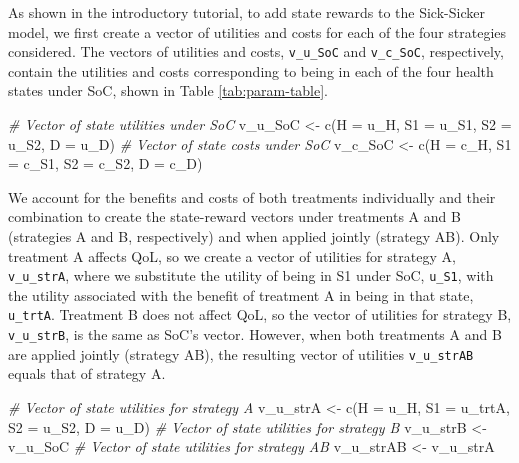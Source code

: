 \documentclass[
]{article}
\newenvironment{Shaded}{\begin{snugshade}}{\end{snugshade}}
\newcommand{\AttributeTok}[1]{\textcolor[rgb]{0.77,0.63,0.00}{#1}}
\newcommand{\CommentTok}[1]{\textcolor[rgb]{0.56,0.35,0.01}{\textit{#1}}}
\newcommand{\FunctionTok}[1]{\textcolor[rgb]{0.00,0.00,0.00}{#1}}
\newcommand{\NormalTok}[1]{#1}
\newcommand{\OtherTok}[1]{\textcolor[rgb]{0.56,0.35,0.01}{#1}}
\begin{document}
As shown in the introductory tutorial, to add state rewards to the Sick-Sicker model, we first create a vector of utilities and costs for each of the four strategies considered. The vectors of utilities and costs, \texttt{v\_u\_SoC} and \texttt{v\_c\_SoC}, respectively, contain the utilities and costs corresponding to being in each of the four health states under SoC, shown in Table \ref{tab:param-table}.

\begin{Shaded}
\begin{Highlighting}[]
\CommentTok{\# Vector of state utilities under SoC}
\NormalTok{v\_u\_SoC }\OtherTok{\textless{}{-}} \FunctionTok{c}\NormalTok{(}\AttributeTok{H =}\NormalTok{ u\_H, }\AttributeTok{S1 =}\NormalTok{ u\_S1, }\AttributeTok{S2 =}\NormalTok{ u\_S2, }\AttributeTok{D =}\NormalTok{ u\_D)}
\CommentTok{\# Vector of state costs under SoC}
\NormalTok{v\_c\_SoC }\OtherTok{\textless{}{-}} \FunctionTok{c}\NormalTok{(}\AttributeTok{H =}\NormalTok{ c\_H, }\AttributeTok{S1 =}\NormalTok{ c\_S1, }\AttributeTok{S2 =}\NormalTok{ c\_S2, }\AttributeTok{D =}\NormalTok{ c\_D)}
\end{Highlighting}
\end{Shaded}

We account for the benefits and costs of both treatments individually and their combination to create the state-reward vectors under treatments A and B (strategies A and B, respectively) and when applied jointly (strategy AB). Only treatment A affects QoL, so we create a vector of utilities for strategy A, \texttt{v\_u\_strA}, where we substitute the utility of being in S1 under SoC, \texttt{u\_S1}, with the utility associated with the benefit of treatment A in being in that state, \texttt{u\_trtA}. Treatment B does not affect QoL, so the vector of utilities for strategy B, \texttt{v\_u\_strB}, is the same as SoC's vector. However, when both treatments A and B are applied jointly (strategy AB), the resulting vector of utilities \texttt{v\_u\_strAB} equals that of strategy A.

\begin{Shaded}
\begin{Highlighting}[]
\CommentTok{\# Vector of state utilities for strategy A}
\NormalTok{v\_u\_strA }\OtherTok{\textless{}{-}} \FunctionTok{c}\NormalTok{(}\AttributeTok{H =}\NormalTok{ u\_H, }\AttributeTok{S1 =}\NormalTok{ u\_trtA, }\AttributeTok{S2 =}\NormalTok{ u\_S2, }\AttributeTok{D =}\NormalTok{ u\_D)}
\CommentTok{\# Vector of state utilities for strategy B}
\NormalTok{v\_u\_strB }\OtherTok{\textless{}{-}}\NormalTok{ v\_u\_SoC}
\CommentTok{\# Vector of state utilities for strategy AB}
\NormalTok{v\_u\_strAB }\OtherTok{\textless{}{-}}\NormalTok{ v\_u\_strA}
\end{Highlighting}
\end{Shaded}
\end{document}
